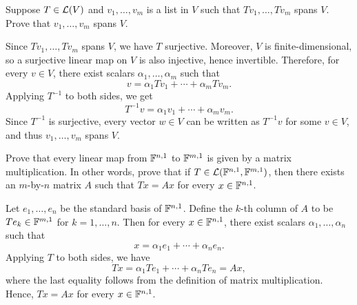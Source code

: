 \begin{exc}
\begin{exercise}
Suppose $T\in\mathcal{L}(V)$ and $v_1,\dots,v_m$ is a list in $V$ such that
$Tv_1,\dots,Tv_m$ spans $V$. Prove that $v_1,\dots,v_m$ spans $V$.
\end{exercise}
\begin{solution}
Since $Tv_1,\dots,Tv_m$ spans $V$, we have $T$ surjective. Moreover, $V$ is
finite-dimensional, so a surjective linear map on $V$ is also injective, hence
invertible. Therefore, for every $v\in V$, there exist scalars
$\alpha_1,\dots,\alpha_m$ such that
\[ v = \alpha_1Tv_1+\cdots+\alpha_mTv_m. \]
Applying $T^{-1}$ to both sides, we get
\[ T^{-1}v = \alpha_1v_1+\cdots+\alpha_mv_m. \]
Since $T^{-1}$ is surjective, every vector $w\in V$ can be written as $T^{-1}v$
for some $v\in V$, and thus $v_1,\dots,v_m$ spans $V$.
\end{solution}

\begin{exercise}
Prove that every linear map from $\mathbb{F}^{n,1}$ to $\mathbb{F}^{m,1}$ is given by a matrix
multiplication. In other words, prove that if $T\in\mathcal{L}(\mathbb{F}^{n,1},\mathbb{F}^{m,1})$,
then there exists an $m$-by-$n$ matrix $A$ such that $Tx=Ax$ for every
$x\in\mathbb{F}^{n,1}$.
\end{exercise}
\begin{solution}
Let $e_1,\dots,e_n$ be the standard basis of $\mathbb{F}^{n,1}$. Define the $k$-th
column of $A$ to be $Te_k\in\mathbb{F}^{m,1}$ for $k=1,\dots,n$. Then for every
$x\in\mathbb{F}^{n,1}$, there exist scalars $\alpha_1,\dots,\alpha_n$ such that
\[ x = \alpha_1e_1+\cdots+\alpha_ne_n. \]
Applying $T$ to both sides, we have
\[ Tx = \alpha_1Te_1+\cdots+\alpha_nTe_n = Ax, \]
where the last equality follows from the definition of matrix multiplication.
Hence, $Tx=Ax$ for every $x\in\mathbb{F}^{n,1}$.
\end{solution}


\end{exc}
